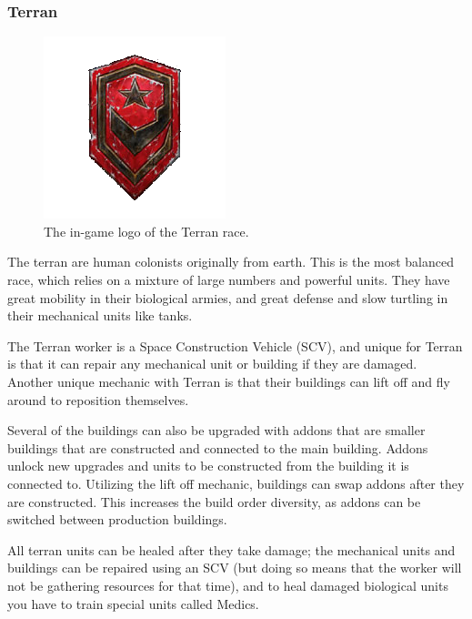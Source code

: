 \subsubsection{Terran}
\begin{figure}[h!tb]
\centering
\includegraphics[scale=0.6]{graphics/terranicon.png}
\caption{The in-game logo of the Terran race.\cite{terranlogo}}
\end{figure}

The terran are human colonists originally from earth. This is the most balanced race, which relies on a mixture of large numbers and powerful units. They have great mobility in their biological armies, and  great defense and slow turtling in their mechanical units like tanks.

The Terran worker is a Space Construction Vehicle (SCV), and unique for Terran is that it can repair any mechanical unit or building if they are damaged. Another unique mechanic with Terran is that their buildings can lift off and fly around to reposition themselves.

Several of the buildings can also be upgraded with addons that are smaller buildings that are constructed and connected to the main building. Addons unlock new upgrades and units to be constructed from the building it is connected to. Utilizing the lift off mechanic, buildings can swap addons after they are constructed. This increases the build order diversity, as addons can be switched between production buildings.

All terran units can be healed after they take damage; the mechanical units and buildings can be repaired using an SCV (but doing so means that the worker will not be gathering resources for that time), and to heal damaged biological units you have to train special units called Medics.

